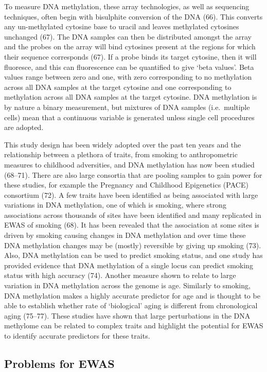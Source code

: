 \documentclass[11pt,oneside]{bristolthesis}
\begin{document}
To measure DNA methylation, these array technologies, as well as sequencing techniques, often begin with bisulphite conversion of the DNA (66). This converts any un-methylated cytosine base to uracil and leaves methylated cytosines unchanged (67). The DNA samples can then be distributed amongst the array and the probes on the array will bind cytosines present at the regions for which their sequence corresponds (67). If a probe binds its target cytosine, then it will fluoresce, and this can fluorescence can be quantified to give `beta values'. Beta values range between zero and one, with zero corresponding to no methylation across all DNA samples at the target cytosine and one corresponding to methylation across all DNA samples at the target cytosine. DNA methylation is by nature a binary measurement, but mixtures of DNA samples (i.e.~multiple cells) mean that a continuous variable is generated unless single cell procedures are adopted.

This study design has been widely adopted over the past ten years and the relationship between a plethora of traits, from smoking to anthropometric measures to childhood adversities, and DNA methylation has now been studied (68--71). There are also large consortia that are pooling samples to gain power for these studies, for example the Pregnancy and Childhood Epigenetics (PACE) consortium (72). A few traits have been identified as being associated with large variations in DNA methylation, one of which is smoking, where strong associations across thousands of sites have been identified and many replicated in EWAS of smoking (68). It has been revealed that the association at some sites is driven by smoking causing changes in DNA methylation and over time these DNA methylation changes may be (mostly) reversible by giving up smoking (73). Also, DNA methylation can be used to predict smoking status, and one study has provided evidence that DNA methylation of a single locus can predict smoking status with high accuracy (74). Another measure shown to relate to large variation in DNA methylation across the genome is age. Similarly to smoking, DNA methylation makes a highly accurate predictor for age and is thought to be able to establish whether rate of `biological' aging is different from chronological aging (75--77). These studies have shown that large perturbations in the DNA methylome can be related to complex traits and highlight the potential for EWAS to identify accurate predictors for these traits.

\hypertarget{problems-for-ewas}{%
\subsection{Problems for EWAS}\label{problems-for-ewas}}
\end{document}
